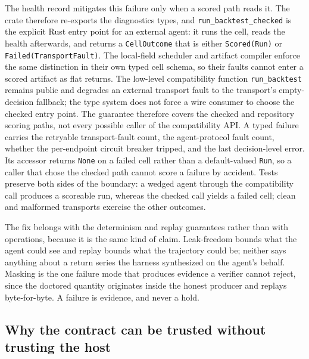 The health record mitigates this failure only when a scored path reads it. The crate therefore re-exports the diagnostics types, and \texttt{run\_backtest\_checked} is the explicit Rust entry point for an external agent: it runs the cell, reads the health afterwards, and returns a \texttt{CellOutcome} that is either \texttt{Scored(Run)} or \texttt{Failed(TransportFault)}. The local-field scheduler and artifact compiler enforce the same distinction in their own typed cell schema, so their faults cannot enter a scored artifact as flat returns. The low-level compatibility function \texttt{run\_backtest} remains public and degrades an external transport fault to the transport's empty-decision fallback; the type system does not force a wire consumer to choose the checked entry point. The guarantee therefore covers the checked and repository scoring paths, not every possible caller of the compatibility API. A typed failure carries the retryable transport-fault count, the agent-protocol fault count, whether the per-endpoint circuit breaker tripped, and the last decision-level error. Its accessor returns \texttt{None} on a failed cell rather than a default-valued \texttt{Run}, so a caller that chose the checked path cannot score a failure by accident. Tests preserve both sides of the boundary: a wedged agent through the compatibility call produces a scoreable run, whereas the checked call yields a failed cell; clean and malformed transports exercise the other outcomes.

The fix belongs with the determinism and replay guarantees rather than with operations, because it is the same kind of claim. Leak-freedom bounds what the agent could see and replay bounds what the trajectory could be; neither says anything about a return series the harness synthesized on the agent's behalf. Masking is the one failure mode that produces evidence a verifier cannot reject, since the doctored quantity originates inside the honest producer and replays byte-for-byte. A failure is evidence, and never a hold.

\subsection{Why the contract can be trusted without trusting the host}\label{sec:contract-trust}


